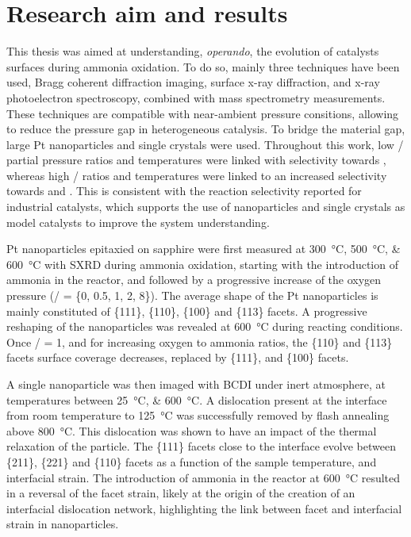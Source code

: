 \section{Research aim and results}

This thesis was aimed at understanding, \textit{operando}, the evolution of catalysts surfaces during ammonia oxidation.
To do so, mainly three techniques have been used, Bragg coherent diffraction imaging, surface x-ray diffraction, and x-ray photoelectron spectroscopy, combined with mass spectrometry measurements.
These techniques are compatible with near-ambient pressure consitions, allowing to reduce the pressure gap in heterogeneous catalysis.
To bridge the material gap, large Pt nanoparticles and single crystals were used.
Throughout this work, low / partial pressure ratios and temperatures were linked with selectivity towards , whereas high / ratios and temperatures were linked to an increased selectivity towards  and .
This is consistent with the reaction selectivity reported for industrial catalysts, which supports the use of nanoparticles and single crystals as model catalysts to improve the system understanding.

Pt nanoparticles epitaxied on sapphire were first measured at \qtylist{300;500;600}{\degreeCelsius} with SXRD during ammonia oxidation, starting with the introduction of ammonia in the reactor, and followed by a progressive increase of the oxygen pressure (/ = \{0, 0.5, 1, 2, 8\}).
The average shape of the Pt nanoparticles is mainly constituted of \{111\}, \{110\}, \{100\} and \{113\} facets.
A progressive reshaping of the nanoparticles was revealed at \qty{600}{\degreeCelsius} during reacting conditions.
Once / = 1, and for increasing oxygen to ammonia ratios, the \{110\} and \{113\} facets surface coverage decreases, replaced by \{111\}, and \{100\} facets.

A single nanoparticle was then imaged with BCDI under inert atmosphere, at temperatures between \qtylist{25;600}{\degreeCelsius}.
A dislocation present at the interface from room temperature to \qty{125}{\degreeCelsius} was successfully removed by flash annealing above \qty{800}{\degreeCelsius}.
This dislocation was shown to have an impact of the thermal relaxation of the particle.
The \{111\} facets close to the interface evolve between \{211\}, \{221\} and \{110\} facets as a function of the sample temperature, and interfacial strain.
The introduction of ammonia in the reactor at \qty{600}{\degreeCelsius} resulted in a reversal of the facet strain, likely at the origin of the creation of an interfacial dislocation network, highlighting the link between facet and interfacial strain in nanoparticles.

